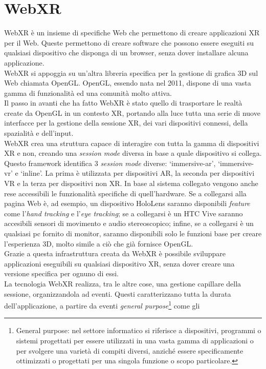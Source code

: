 \section{WebXR}\label{sec:WebXR}
WebXR è un insieme di specifiche Web che permettono di creare applicazioni XR per il Web. Queste permettono di creare software che possono essere eseguiti su qualsiasi dispositivo
che disponga di un browser, senza dover installare alcuna applicazione\cite{WebXR}.\\
WebXR si appoggia su un'altra libreria specifica per la gestione di grafica 3D sul Web chiamata OpenGL. OpenGL, essendo nata nel 2011, dispone di una vasta gamma di funzionalità
ed una comunità molto attiva.\\
Il passo in avanti che ha fatto WebXR è stato quello di trasportare le realtà create da OpenGL in un contesto XR, portando alla luce tutta una serie di nuove interfacce per la gestione
della sessione XR, dei vari dispositivi connessi, della spazialità e dell'input.\\
WebXR crea una struttura capace di interagire con tutta la gamma di dispositivi XR e non, creando una \textit{session mode} diversa in base a quale dispositivo si collega. Questo
framework identifica 3 \textit{session mode} diverse: `immersive-ar', `immersive-vr' e `inline'. La prima è utilizzata per dispositivi AR, la seconda per dispositivi VR e la terza
per dispositivi non XR. In base al sistema collegato vengono anche rese accessibili le funzionalità specifiche di quell'hardware. Se a collegarsi alla pagina Web è, ad esempio, un 
dispositivo HoloLens saranno disponibili \textit{feature} come l'\textit{hand tracking} e l'\textit{eye tracking}; se a collegarsi è un HTC Vive saranno accesibili sensori di movimento
e audio stereoscopico; infine, se a collegarsi è un qualsiasi pc fornito di monitor, saranno disponibili solo le funzioni base per creare l'esperienza 3D, molto simile a ciò che 
già fornisce OpenGL.\\
Grazie a questa infrastruttura creata da WebXR è possibile sviluppare applicazioni eseguibili su qualsiasi dispositivo XR, senza dover creare una versione specifica per ognuno di essi.\\
\newline
La tecnologia WebXR realizza, tra le altre cose, una gestione capillare della sessione, organizzandola ad eventi. Questi caratterizzano tutta la durata dell'applicazione, a partire da
eventi \textit{general purpose}\footnote{General purpose: nel settore informatico si riferisce a dispositivi, programmi o sistemi progettati per essere utilizzati in una vasta gamma 
di applicazioni o per svolgere una varietà di compiti diversi, anziché essere specificamente ottimizzati o progettati per una singola funzione o scopo particolare.} come gli 
